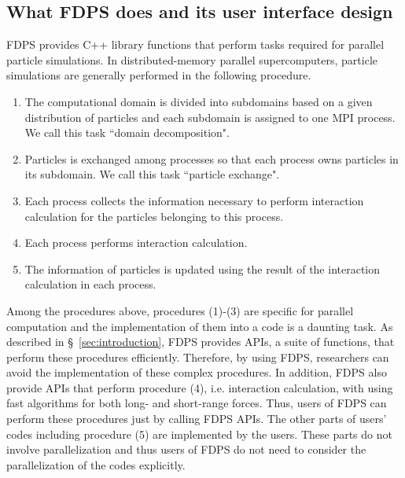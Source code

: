 \documentclass[proof,useamsfonts]{pasj01}
\begin{document}
\subsection{What FDPS does and its user interface design}
\label{subsec:what_fdps_is}
FDPS provides C++ library functions that perform tasks required for parallel particle simulations. In distributed-memory parallel supercomputers, particle simulations are generally performed in the following procedure.
\begin{enumerate}[label=(\arabic*)]
\item The computational domain is divided into subdomains based on a given distribution of particles and each subdomain is assigned to one MPI process. We call this task ``domain decomposition". 
\item Particles is exchanged among processes so that each process owns particles in its subdomain. We call this task ``particle exchange".
\item Each process collects the information necessary to perform interaction calculation for the particles belonging to this process.
\item Each process performs interaction calculation.
\item The information of particles is updated using the result of the interaction calculation in each process.
\end{enumerate}
Among the procedures above, procedures (1)-(3) are specific for parallel computation and the implementation of them into a code is a daunting task. As described in \S~\ref{sec:introduction}, FDPS provides APIs, a suite of functions, that perform these procedures efficiently. Therefore, by using FDPS, researchers can avoid the implementation of these complex procedures. In addition, FDPS also provide APIs that perform procedure (4), i.e. interaction calculation, with using fast algorithms for both long- and short-range forces. Thus, users of FDPS can perform these procedures just by calling FDPS APIs. The other parts of users' codes including procedure (5) are implemented by the users. These parts do not involve parallelization and thus users of FDPS do not need to consider the parallelization of the codes explicitly.
\end{document}
